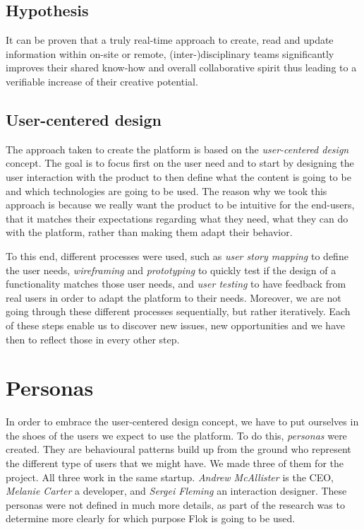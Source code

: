\documentclass[a4paper,12pt,twoside]{article}
\begin{document}
\subsection{Hypothesis}
\label{hypothesis}
It can be proven that a truly real-time approach to create, read and update information within on-site or remote, (inter-)disciplinary teams significantly improves their shared know-how and overall collaborative spirit thus leading to a verifiable increase of their creative potential.

\subsection{User-centered design}
The approach taken to create the platform is based on the \emph{user-centered design} concept.
The goal is to focus first on the user need and to start by designing the user interaction with the product to then define what the content is going to be and which technologies are going to be used.
The reason why we took this approach is because we really want the product to be intuitive for the end-users, that it matches their expectations regarding what they need, what they can do with the platform, rather than making them adapt their behavior.

To this end, different processes were used, such as \emph{user story mapping} to define the user needs, \emph{wireframing} and \emph{prototyping} to quickly test if the design of a functionality matches those user needs, and \emph{user testing} to have feedback from real users in order to adapt the platform to their needs.
Moreover, we are not going through these different processes sequentially, but rather iteratively.
Each of these steps enable us to discover new issues, new opportunities and we have then to reflect those in every other step.


\section{Personas}
In order to embrace the user-centered design concept, we have to put ourselves in the shoes of the users we expect to use the platform. To do this, \emph{personas} were created.
They are behavioural patterns build up from the ground who represent the different type of users that we might have.
We made three of them for the project.
All three work in the same startup. \emph{Andrew McAllister} is the CEO, \emph{Melanie Carter} a developer, and \emph{Sergei Fleming} an interaction designer.
These personas were not defined in much more details, as part of the research was to determine more clearly for which purpose Flok is going to be used. %
\end{document}
